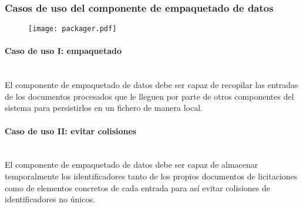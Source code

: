 \newpage
        \subsubsection{Casos de uso del componente de empaquetado de datos}
    
            \begin{figure}[h]
                \centering
                \texttt{[image: packager.pdf]}
                \label{fig:packager}
            \end{figure}
            
            \paragraph{Caso de uso I: empaquetado} \mbox{}\\
                El componente de empaquetado de datos debe ser capaz de recopilar las entradas de los documentos procesados que le lleguen por parte de otros componentes del sistema para persistirlos en un fichero de manera local.
                
            \paragraph{Caso de uso II: evitar colisiones} \mbox{}\\
                El componente de empaquetado de datos debe ser capaz de almacenar temporalmente los identificadores tanto de los propios documentos de licitaciones como de elementos concretos de cada entrada para así evitar colisiones de identificadores no únicos.
        
